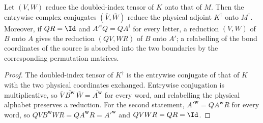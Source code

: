 \begin{lemma}
    \label{thm:mpug_reduction_dagger}
    \leanok
    Let $(V,W)$ reduce the doubled-index tensor of $K$ onto that of $M$. Then
    the entrywise complex conjugates $(\overline V,\overline W)$ reduce the
    physical adjoint $K^\dagger$ onto $M^\dagger$. Moreover, if $Q R=\Id$ and
    $A'^{i}Q=QA^{i}$ for every letter, a reduction $(V,W)$ of $B$ onto $A$
    gives the reduction $(QV,WR)$ of $B$ onto $A'$; a relabelling of the bond
    coordinates of the source is absorbed into the two boundaries by the
    corresponding permutation matrices.
\end{lemma}

\begin{proof}\leanok
    The doubled-index tensor of $K^\dagger$ is the entrywise conjugate of that
    of $K$ with the two physical coordinates exchanged. Entrywise conjugation
    is multiplicative, so $\overline V\,\overline{B^{\mathbf w}}\,\overline W
        =\overline{A^{\mathbf w}}$ for every word, and relabelling the physical
    alphabet preserves a reduction. For the second statement,
    $A'^{\mathbf w}=QA^{\mathbf w}R$ for every word, so
    $QVB^{\mathbf w}WR=QA^{\mathbf w}R=A'^{\mathbf w}$ and $QVWR=QR=\Id$.
\end{proof}

